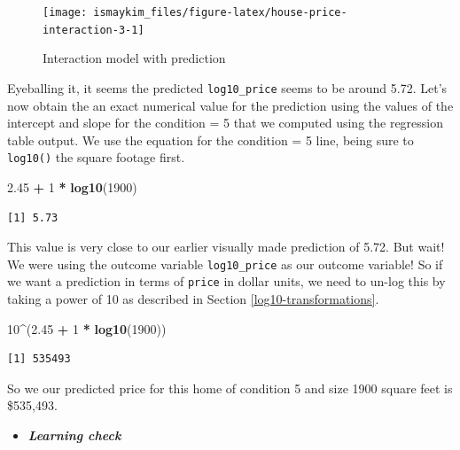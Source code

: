 \documentclass[12pt, krantz2,]{krantz}
\makeatletter
\newenvironment{Shaded}{\begin{snugshade}}{\end{snugshade}}
\newcommand{\DecValTok}[1]{\textcolor[rgb]{0.06,0.06,0.06}{#1}}
\newcommand{\FloatTok}[1]{\textcolor[rgb]{0.06,0.06,0.06}{#1}}
\newcommand{\KeywordTok}[1]{\textcolor[rgb]{0.27,0.27,0.27}{\textbf{#1}}}
\newcommand{\NormalTok}[1]{#1}
\newcommand{\OperatorTok}[1]{\textcolor[rgb]{0.43,0.43,0.43}{\textbf{#1}}}
\newcommand{\StringTok}[1]{\textcolor[rgb]{0.5,0.5,0.5}{#1}}
\newenvironment{kframe}{%
\medskip{}
\setlength{\fboxsep}{.8em}
 \def\at@end@of@kframe{}%
 \ifinner\ifhmode%
  \def\at@end@of@kframe{\end{minipage}}%
  \begin{minipage}{\columnwidth}%
 \fi\fi%
 \def\FrameCommand##1{\hskip\@totalleftmargin \hskip-\fboxsep
 \colorbox{shadecolor}{##1}\hskip-\fboxsep
     \hskip-\linewidth \hskip-\@totalleftmargin \hskip\columnwidth}%
 \MakeFramed {\advance\hsize-\width
   \@totalleftmargin\z@ \linewidth\hsize
   \@setminipage}}%
 {\par\unskip\endMakeFramed%
 \at@end@of@kframe}
\renewenvironment{Shaded}{\begin{kframe}}{\end{kframe}}
\newenvironment{rmdblock}[1]
  {\begin{shaded*}
  \begin{itemize}
  \renewcommand{\labelitemi}{
    \raisebox{-.7\height}[0pt][0pt]{
    }
  }
  \item
  }
  {
  \end{itemize}
  \end{shaded*}
  }
\newenvironment{learncheck}
  {\begin{rmdblock}{warning}}
  {\end{rmdblock}}
\makeatother
\begin{document}
\begin{figure}

{\centering \texttt{[image: ismaykim\_files/figure-latex/house-price-interaction-3-1]} 

}

\caption{Interaction model with prediction}\label{fig:house-price-interaction-3}
\end{figure}

Eyeballing it, it seems the predicted \texttt{log10\_price} seems to be around 5.72. Let's now obtain the an exact numerical value for the prediction using the values of the intercept and slope for the condition = 5 that we computed using the regression table output. We use the equation for the condition = 5 line, being sure to \texttt{log10()} the
square footage first.

\begin{Shaded}
\begin{Highlighting}[]
\FloatTok{2.45} \OperatorTok{+}\StringTok{ }\DecValTok{1} \OperatorTok{*}\StringTok{ }\KeywordTok{log10}\NormalTok{(}\DecValTok{1900}\NormalTok{)}
\end{Highlighting}
\end{Shaded}

\begin{verbatim}
[1] 5.73
\end{verbatim}

This value is very close to our earlier visually made prediction of 5.72. But wait! We were using the outcome variable \texttt{log10\_price} as our outcome variable! So if we want a prediction in terms of \texttt{price} in dollar units, we need to un-log this by taking a power of 10 as described in Section \ref{log10-transformations}.

\begin{Shaded}
\begin{Highlighting}[]
\DecValTok{10}\OperatorTok{^}\NormalTok{(}\FloatTok{2.45} \OperatorTok{+}\StringTok{ }\DecValTok{1} \OperatorTok{*}\StringTok{ }\KeywordTok{log10}\NormalTok{(}\DecValTok{1900}\NormalTok{))}
\end{Highlighting}
\end{Shaded}

\begin{verbatim}
[1] 535493
\end{verbatim}

So we our predicted price for this home of condition 5 and size 1900 square feet is \$535,493.

\begin{learncheck}
\textbf{\emph{Learning check}}
\end{learncheck}
\end{document}
